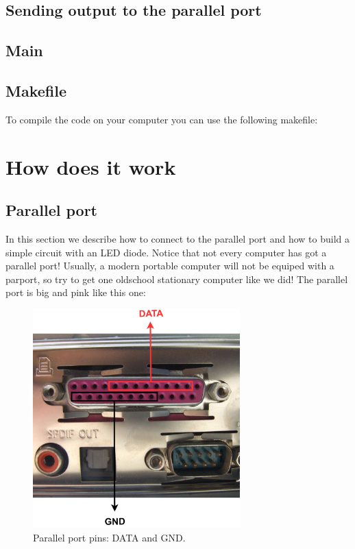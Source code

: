 \documentclass[12pt]{report}
\begin{document}
\subsection{Sending output to the parallel port}



\subsection{Main}



\subsection{Makefile}

To compile the code on your computer you can use the following makefile:




\section{How does it work}

\newpage

\subsection{Parallel port}

In this section we describe how to connect to the parallel port and how to build a simple circuit with an LED diode. Notice that not every computer has got a parallel port! Usually, a modern portable computer will not be equiped with a parport, so try to get one oldschool stationary computer like we did! The parallel port is big and pink like this one:

\begin{figure}[H]
\centering\includegraphics[width=8cm]{par_port}
\caption{Parallel port pins: DATA and GND.}				
\label{fig:par_port}
\end{figure}
\end{document}
